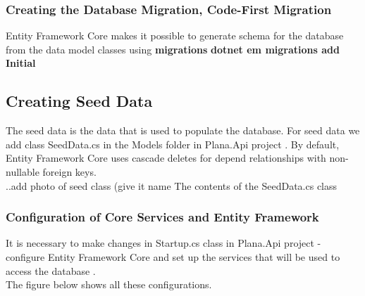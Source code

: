 \documentclass{scrartcl}
\begin{document}
\subsubsection{Creating the Database Migration, Code-First Migration}
Entity Framework Core makes it possible to generate schema for the database from the data model classes using \textbf{migrations}
\textbf{dotnet em migrations add Initial} 
\cite{core3}



\subsection{Creating Seed Data}
The seed data is the data that is used to populate the database. For seed data we add class SeedData.cs in the Models folder in Plana.Api project \cite{core3}.
By default, Entity Framework Core uses cascade deletes for depend relationships with non-nullable foreign keys. \cite{efa} \\
..add photo of seed class (give it name The contents of the SeedData.cs class \\
\subsubsection{Configuration of Core Services and Entity Framework}

It is necessary to make changes in Startup.cs class in Plana.Api project - configure Entity Framework Core and set up the services that will be used to access the database \cite{efa}.\\
The figure below shows all these configurations.
\end{document}
